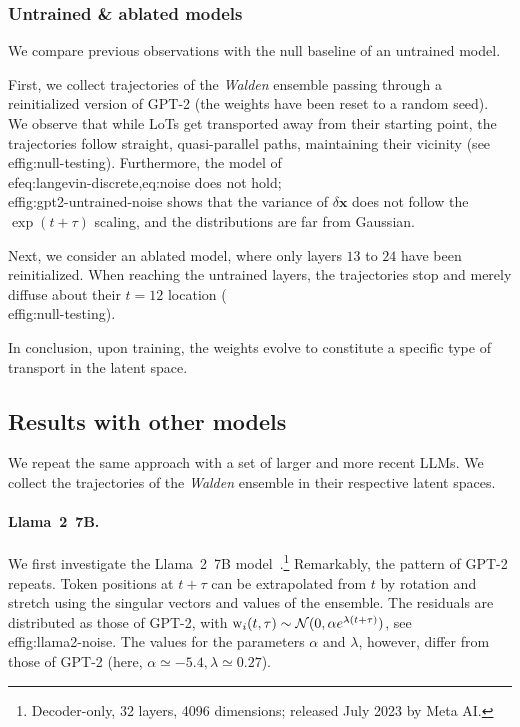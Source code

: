 \documentclass{article} %
\def\rw{{\textnormal{w}}}
\def\vx{{\bm{x}}}
\begin{document}
\subsubsection{Untrained \& ablated models}
We compare previous observations with the null baseline of an untrained model.

First, we collect trajectories of the \textit{Walden} ensemble passing through a reinitialized version of GPT-2 (the weights have been reset to a random seed).
We observe that while LoTs get transported away from their starting point, the trajectories follow straight, quasi-parallel paths, maintaining their vicinity (see \\ef{fig:null-testing}).
Furthermore, the model of \\ef{eq:langevin-discrete,eq:noise} does not hold; \\ef{fig:gpt2-untrained-noise} shows that the variance of $\delta \vx$ does not follow the $\exp(t+\tau)$ scaling, and the distributions are far from Gaussian.

Next, we consider an ablated model, where only layers $13$ to $24$ have been reinitialized.
When reaching the untrained layers, the trajectories stop and merely diffuse about their $t=12$ location (\\ef{fig:null-testing}).

In conclusion, upon training, the weights evolve to constitute a specific type of transport in the latent space.



\subsection{Results with other models} 
\label{sec:other-models}

We repeat the same approach with a set of larger and more recent LLMs.
We collect the trajectories of the \textit{Walden} ensemble in their respective latent spaces.

\paragraph{Llama~2~7B.}
We first investigate the Llama~2~7B model~\citep{touvron2023llama2openfoundation}.\footnote{
Decoder-only, 32 layers, 4096 dimensions; released July 2023 by Meta AI.
} 
Remarkably, the pattern of GPT-2 repeats.
Token positions at $t+\tau$ can be extrapolated from $t$ by rotation and stretch using the singular vectors and values of the ensemble.
The residuals are distributed as those of GPT-2, with $\rw_i(t,\tau) \sim \mathcal{N}(0,\alpha e^{\lambda (t+\tau)})$, see \\ef{fig:llama2-noise}. 
The values for the parameters $\alpha$ and $\lambda$, however, differ from those of GPT-2 (here, $\alpha \simeq -5.4, \lambda \simeq 0.27$).
\end{document}
